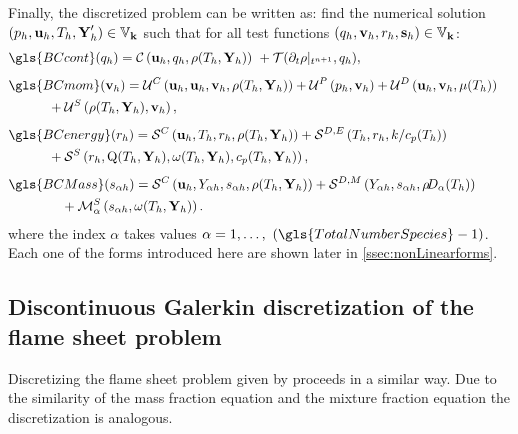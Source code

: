 Finally, the discretized problem can be written as: find the numerical solution $(p_h,\textbf{u}_h, T_h, \textbf{Y}'_h) \in \mathbb{V}_{\textbf{k}}$ such that for all test functions $(q_h,\textbf{v}_h, r_h, \mathbf{s}_h) \in \mathbb{V}_{\textbf{k}}$:
\begin{subequations}
	\begin{flalign}%
		&\gls{BCcont}(q_h)= \ContDis\ + \mathcal{T}(\partial_t \rho|_{t^{n+1}},q_h ) ,& \label{DiscretizedConti}\\[1ex]
		&\gls{BCmom}(\vec{v}_h) =	\MomConv + \MomPres + \MomDiff & \notag\\
		& \quad\quad\quad + \MomSource,& \label{DiscretizedMomentum}\\[1ex]
		&\gls{BCenergy}(r_h)
		 = \mathcal{S}^C\left(\vec{u}_h,T_h,r_h, \rhoh\right) + \mathcal{S}^{D,E}\left(T_h,r_h,k/c_p(T_h)\right)&  \notag\\
		& \quad\quad\quad + \mathcal{S}^S\left(r_h, \heatRelease(T_h,\vec{Y}_h), \rateReac(T_h,\vec{Y}_h),\cph\right),& \label{DiscretizedEnergy}   \\[1ex]
		&\gls{BCMass}(s_{\alpha h})= \mathcal{S}^C\left(\vec{u}_h,\Yi, s_{\alpha h}, \rhoh\right) + \mathcal{S}^{D,M}\left(\Yi,s_{\alpha h},\rhodh\right)&  \notag \\
		& \quad\quad\quad\quad + \mathcal{M}^S_\alpha\left(s_{\alpha h},\rateReac(T_h,\vec{Y}_h )\right).& \label{DiscretizedMassFractions}
	\end{flalign}\label{eqs:variatProblemFull}
\end{subequations}
where the index $\alpha$ takes values $\alpha = 1, \dots,~(\gls{TotalNumberSpecies} - 1)$. Each one of the forms introduced here are shown later in \cref{ssec:nonLinearforms}.
\subsection{Discontinuous Galerkin discretization of the flame sheet problem}
Discretizing the flame sheet problem given by  proceeds in a similar way. Due to the similarity of the mass fraction equation and the mixture fraction equation the discretization is analogous.

